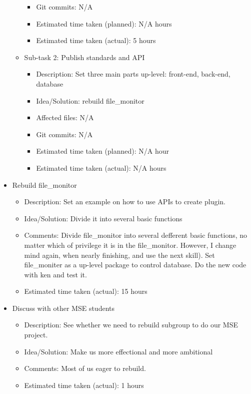 \documentclass{article}
\begin{document}
\begin{itemize}
\begin{itemize}
\begin{itemize}
					\item Git commits: N/A
					\item Estimated time taken (planned): N/A hours
					\item Estimated time taken (actual): 5 hours
				 \end{itemize}
	         \item Sub-task 2: Publish standards and API
	            \begin{itemize}
				    \item Description: Set three main parts up-level: front-end, back-end, database
					\item Idea/Solution: rebuild file\_monitor 
					\item Affected files: N/A
					\item Git commits: N/A
					\item Estimated time taken (planned): N/A hour
					\item Estimated time taken (actual):  N/A hours
				 \end{itemize}
	     \end{itemize}
	\item Rebuild file\_monitor
	     \begin{itemize}
	         \item Description: Set an example on how to use APIs to create plugin. 
	         \item Idea/Solution: Divide it into several basic functions
	         \item Comments: Divide file\_monitor into several defferent basic functions, no matter which of privilege it is in the file\_monitor. However, I change mind again, when nearly finishing, and use the next skill). Set file\_moniter as a up-level package to control database. Do the new code with ken and test it.
	         \item Estimated time taken (actual): 15 hours
	     \end{itemize}
	\item Discuss with other MSE students
	     \begin{itemize}
	         \item Description: See whether we need to rebuild subgroup to do our MSE project. 
	         \item Idea/Solution: Make us more effectional and more ambitional
	         \item Comments: Most of us eager to rebuild.
	         \item Estimated time taken (actual): 1 hours
	     \end{itemize}

\end{itemize}
\end{document}
